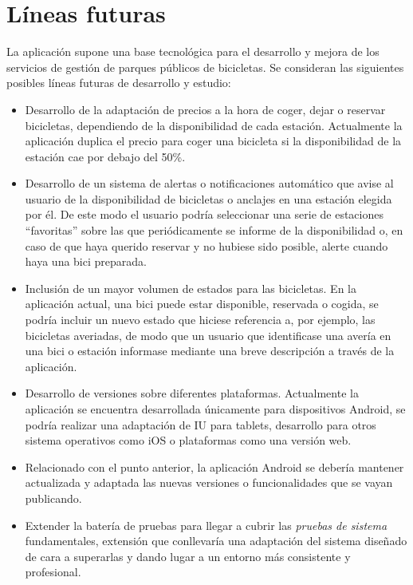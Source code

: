 \section{Líneas futuras}

La aplicación supone una base tecnológica para el desarrollo y mejora de los servicios de gestión de parques públicos de bicicletas. Se consideran las siguientes posibles líneas futuras de desarrollo y estudio:

\begin{itemize}  
	\item Desarrollo de la adaptación de precios a la hora de coger, dejar o reservar bicicletas, dependiendo de la disponibilidad de cada estación. Actualmente la aplicación duplica el precio para coger una bicicleta si la disponibilidad de la estación cae por debajo del 50\%.
	\item Desarrollo de un sistema de alertas o notificaciones automático que avise al usuario de la disponibilidad de bicicletas o anclajes en una estación elegida por él. De este modo el usuario podría seleccionar una serie de estaciones ``favoritas'' sobre las que periódicamente se informe de la disponibilidad o, en caso de que haya querido reservar y no hubiese sido posible, alerte cuando haya una bici preparada.
	\item Inclusión de un mayor volumen de estados para las bicicletas. En la aplicación actual, una bici puede estar disponible, reservada o cogida, se podría incluir un nuevo estado que hiciese referencia a, por ejemplo, las bicicletas averiadas, de modo que un usuario que identificase una avería en una bici o estación informase mediante una breve descripción a través de la aplicación.
	\item Desarrollo de versiones sobre diferentes plataformas. Actualmente la aplicación se encuentra desarrollada únicamente para dispositivos Android, se podría realizar una adaptación de IU para tablets, desarrollo para otros sistema operativos como iOS o plataformas como una versión web.
	\item Relacionado con el punto anterior, la aplicación Android se debería mantener actualizada y adaptada las nuevas versiones o funcionalidades que se vayan publicando.
	\item Extender la batería de pruebas para llegar a cubrir las \emph{pruebas de sistema} fundamentales, extensión que conllevaría una adaptación del sistema diseñado de cara a superarlas y dando lugar a un entorno más consistente y profesional.
\end{itemize}